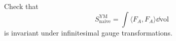 \begin{exercise}
  Check that
  \begin{equation*}
    S_{\text{naive}}^{\text{YM}}
    = \int \langle F_A, F_A \rangle \dd \text{vol}
  \end{equation*}
  is invariant under infinitesimal gauge transformations.
\end{exercise}
